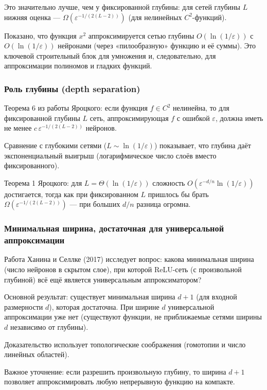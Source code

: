 \documentclass[12pt]{article}
\begin{document}
	Это значительно лучше, чем у фиксированной глубины: для сетей глубины \(L\) нижняя оценка — \(\Omega(\varepsilon^{-1/(2(L-2))})\) (для нелинейных \(C^2\)-функций).
	
	Показано, что функция \(x^2\) аппроксимируется сетью глубины \(O(\ln(1/\varepsilon))\) с \(O(\ln(1/\varepsilon))\) нейронами (через «пилообразную» функцию и её суммы). Это ключевой строительный блок для умножения и, следовательно, для аппроксимации полиномов и гладких функций.
	
	\subsubsection*{Роль глубины (depth separation)}
	
	Теорема 6 из работы Яроцкого: если функция \(f\in C^2\) нелинейна, то для фиксированной глубины \(L\) сеть, аппроксимирующая \(f\) с ошибкой \(\varepsilon\), должна иметь не менее \(c\,\varepsilon^{-1/(2(L-2))}\) нейронов.
	
	Сравнение с глубокими сетями (\(L\sim \ln(1/\varepsilon)\)) показывает, что глубина даёт экспоненциальный выигрыш (логарифмическое число слоёв вместо фиксированного).
	
	Теорема 1 Яроцкого: для \(L=\Theta(\ln(1/\varepsilon))\) сложность \(O(\varepsilon^{-d/n}\ln(1/\varepsilon))\) достигается, тогда как при фиксированном \(L\) пришлось бы брать \(\Omega(\varepsilon^{-1/(2(L-2))})\) — при больших \(d/n\) разница огромна.
	
	\subsubsection*{Минимальная ширина, достаточная для универсальной аппроксимации}
	
	Работа Ханина и Селлке (2017) исследует вопрос: какова минимальная ширина (число нейронов в скрытом слое), при которой ReLU-сеть (с произвольной глубиной) всё ещё является универсальным аппроксиматором?
	
	Основной результат: существует минимальная ширина \(d+1\) (для входной размерности \(d\)), которая достаточна. При ширине \(d\) универсальной аппроксимации уже нет (существуют функции, не приближаемые сетями ширины \(d\) независимо от глубины).
	
	Доказательство использует топологические соображения (гомотопии и число линейных областей).
	
	Важное уточнение: если разрешить произвольную глубину, то ширина \(d+1\) позволяет аппроксимировать любую непрерывную функцию на компакте.
	
\end{document}
